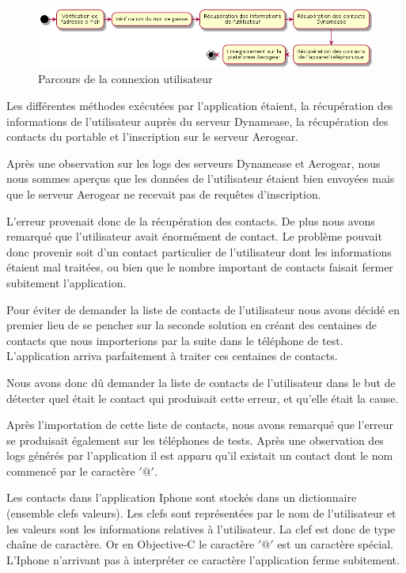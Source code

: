 \begin{figure}[!h]
	\centering
	\includegraphics[scale=0.5]{img/activity_ios.png}
	\caption{\label{activity_ios} {Parcours de la connexion utilisateur}}
\end{figure}

Les différentes méthodes exécutées par l'application étaient, la récupération des informations de l'utilisateur auprès du serveur Dynamease, la récupération des contacts du portable et l'inscription sur le serveur Aerogear.

Après une observation sur les logs des serveurs Dynamease et Aerogear, nous nous sommes aperçus que les données de l'utilisateur étaient bien envoyées mais que le serveur Aerogear ne recevait pas de requêtes d'inscription.

L'erreur provenait donc de la récupération des contacts. De plus nous avons remarqué que l'utilisateur avait énormément de contact. Le problème pouvait donc provenir soit d'un contact particulier de l'utilisateur dont les informations étaient mal traitées, ou bien que le nombre important de contacts faisait fermer subitement l'application.

Pour éviter de demander la liste de contacts de l'utilisateur nous avons décidé en premier lieu de se pencher sur la seconde solution en créant des centaines de contacts que nous importerions par la suite dans le téléphone de test. L'application arriva parfaitement à traiter ces centaines de contacts.

Nous avons donc dû demander la liste de contacts de l'utilisateur dans le but de détecter quel était le contact qui produisait cette erreur, et qu'elle était la cause.

Après l'importation de cette liste de contacts, nous avons remarqué que l'erreur se produisait également sur les téléphones de tests. Après une observation des logs générés par l'application il est apparu qu'il existait un contact dont le nom commencé par le caractère $'@'$.

Les contacts dans l'application Iphone sont stockés dans un dictionnaire (ensemble clefs valeurs). Les clefs sont représentées par le nom de l'utilisateur et les valeurs sont les informations relatives à l'utilisateur. La clef est donc de type chaîne de caractère. Or en Objective-C le caractère $'@'$ est un caractère spécial. L'Iphone n'arrivant pas à interpréter ce caractère l'application ferme subitement.

